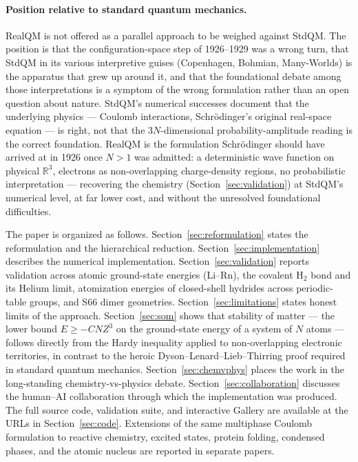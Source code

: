 \documentclass[11pt]{article}
\begin{document}
\paragraph{Position relative to standard quantum mechanics.}
RealQM is not offered as a parallel approach to be weighed against StdQM. The position is that the configuration-space step of 1926--1929 was a wrong turn, that StdQM in its various interpretive guises (Copenhagen, Bohmian, Many-Worlds) is the apparatus that grew up around it, and that the foundational debate among those interpretations is a symptom of the wrong formulation rather than an open question about nature. StdQM's numerical successes document that the underlying physics --- Coulomb interactions, Schr\"odinger's original real-space equation --- is right, not that the $3N$-dimensional probability-amplitude reading is the correct foundation. RealQM is the formulation Schr\"odinger should have arrived at in 1926 once $N>1$ was admitted: a deterministic wave function on physical $\mathbb{R}^3$, electrons as non-overlapping charge-density regions, no probabilistic interpretation --- recovering the chemistry (Section~\ref{sec:validation}) at StdQM's numerical level, at far lower cost, and without the unresolved foundational difficulties.

The paper is organized as follows. Section~\ref{sec:reformulation} states the reformulation and the hierarchical reduction. Section~\ref{sec:implementation} describes the numerical implementation. Section~\ref{sec:validation} reports validation across atomic ground-state energies (Li--Rn), the covalent H$_2$ bond and its Helium limit, atomization energies of closed-shell hydrides across periodic-table groups, and S66 dimer geometries. Section~\ref{sec:limitations} states honest limits of the approach. Section~\ref{sec:som} shows that stability of matter --- the lower bound $E \ge -C N Z^3$ on the ground-state energy of a system of $N$ atoms --- follows directly from the Hardy inequality applied to non-overlapping electronic territories, in contrast to the heroic Dyson--Lenard--Lieb--Thirring proof required in standard quantum mechanics. Section~\ref{sec:chemvphys} places the work in the long-standing chemistry-vs-physics debate. Section~\ref{sec:collaboration} discusses the human--AI collaboration through which the implementation was produced. The full source code, validation suite, and interactive Gallery are available at the URLs in Section~\ref{sec:code}. Extensions of the same multiphase Coulomb formulation to reactive chemistry, excited states, protein folding, condensed phases, and the atomic nucleus are reported in separate papers.
\end{document}

